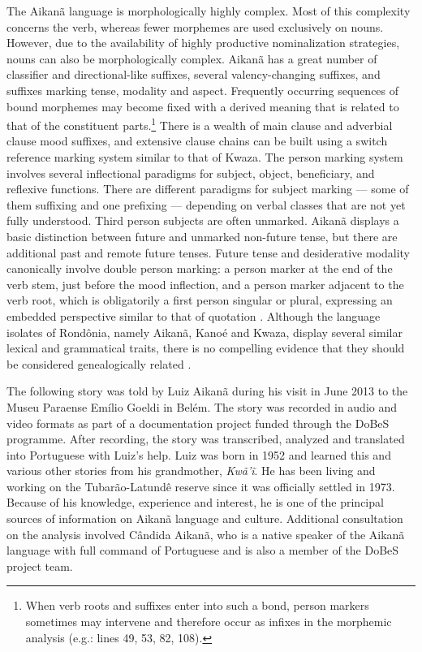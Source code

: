 \documentclass[output=paper,
modfonts,nonflat
]{langsci/langscibook}
\begin{document}
The Aikanã language is morphologically highly complex. Most of this complexity concerns the verb, whereas fewer morphemes are used exclusively on nouns. However, due to the availability of highly productive nominalization strategies, nouns can also be morphologically complex. Aikanã has a great number of classifier and directional-like suffixes, several valency-changing suffixes, and suffixes marking tense, modality and aspect. Frequently occurring sequences of bound morphemes may become fixed with a derived meaning that is related to that of the constituent parts.\footnote{When verb roots and suffixes enter into such a bond, person markers sometimes may intervene and therefore occur as infixes in the morphemic analysis (e.g.: lines 49, 53, 82, 108).} There is a wealth of main clause and adverbial clause mood suffixes, and extensive clause chains can be built using a switch reference marking system similar to that of Kwaza. The person marking system involves several inflectional paradigms for subject, object, beneficiary, and reflexive functions. There are different paradigms for subject marking — some of them suffixing and one prefixing — depending on verbal classes that are not yet fully understood. Third person subjects are often unmarked. Aikanã displays a basic distinction between future and unmarked non-future tense, but there are additional past and remote future tenses. Future tense and desiderative modality canonically involve double person marking: a  person marker at the end of the verb stem, just before the mood inflection, and a person marker adjacent to the verb root, which is obligatorily a first person singular or plural, expressing an embedded perspective similar to that of quotation \citep{VanderVoort2013,VanderVoort2016}. Although the language isolates of Rondônia, namely Aikanã, Kanoé and Kwaza, display several similar lexical and grammatical traits, there is no compelling evidence that they should be considered genealogically related \citep{hvw:vanderVoort:Kwaza}.

The following story was told by Luiz Aikanã during his visit in June 2013 to the Museu Paraense Emílio Goeldi in Belém.
The story was recorded in audio and video formats as part of a documentation project funded through the DoBeS programme. After recording, the story was transcribed, analyzed and translated into Portuguese with Luiz's help. Luiz was born in 1952 and learned this and various other stories from his grandmother, \textit{Kwã’ĩ}. He has been living and working on the Tubarão-Latundê reserve since it was officially settled in 1973. Because of his knowledge, experience and interest, he is one of the principal sources of information on Aikanã language and culture. Additional consultation on the analysis involved Cândida Aikanã, who is a native speaker of the Aikanã language with full command of Portuguese and is also a member of the DoBeS project team.
 
\end{document}
